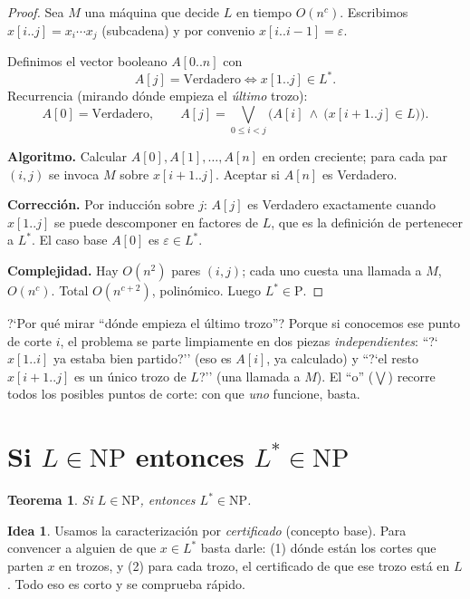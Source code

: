 \documentclass[11pt,a4paper]{article}
\theoremstyle{plain}
\newtheorem{teorema}{Teorema}
\theoremstyle{definition}
\newtheorem*{idea}{Idea}
\newcommand{\NP}{\mathrm{NP}}
\newcommand{\Pclass}{\mathrm{P}}
\newcommand{\Lstar}{L^{*}}
\begin{document}
\begin{proof}
Sea $M$ una m\'aquina que decide $L$ en tiempo $O(n^{c})$. Escribimos
$x[i..j]=x_i\cdots x_j$ (subcadena) y por convenio $x[i..i-1]=\varepsilon$.

Definimos el vector booleano $A[0..n]$ con
\[
A[j] = \text{Verdadero} \iff x[1..j]\in\Lstar .
\]
Recurrencia (mirando d\'onde empieza el \emph{\'ultimo} trozo):
\[
A[0]=\text{Verdadero}, \qquad
A[j]=\bigvee_{0\le i<j}\Big(A[i]\ \wedge\ \big(x[i+1..j]\in L\big)\Big).
\]

\textbf{Algoritmo.} Calcular $A[0],A[1],\dots,A[n]$ en orden creciente; para cada par
$(i,j)$ se invoca $M$ sobre $x[i+1..j]$. Aceptar si $A[n]$ es Verdadero.

\textbf{Correcci\'on.} Por inducci\'on sobre $j$: $A[j]$ es Verdadero exactamente
cuando $x[1..j]$ se puede descomponer en factores de $L$, que es la definici\'on de
pertenecer a $\Lstar$. El caso base $A[0]$ es $\varepsilon\in\Lstar$.

\textbf{Complejidad.} Hay $O(n^2)$ pares $(i,j)$; cada uno cuesta una llamada a $M$,
$O(n^c)$. Total $O(n^{c+2})$, polin\'omico. Luego $\Lstar\in\Pclass$.
\end{proof}

\begin{porque}
?`Por qu\'e mirar ``d\'onde empieza el \'ultimo trozo''? Porque si conocemos ese punto
de corte $i$, el problema se parte limpiamente en dos piezas \emph{independientes}:
``?`$x[1..i]$ ya estaba bien partido?'' (eso es $A[i]$, ya calculado) y ``?`el resto
$x[i+1..j]$ es un \'unico trozo de $L$?'' (una llamada a $M$). El ``o'' ($\bigvee$)
recorre todos los posibles puntos de corte: con que \emph{uno} funcione, basta.
\end{porque}

\section{Si $L\in\NP$ entonces $\Lstar\in\NP$}

\begin{teorema}
Si $L\in\NP$, entonces $\Lstar\in\NP$.
\end{teorema}

\begin{idea}
Usamos la caracterizaci\'on por \emph{certificado} (concepto base). Para convencer a
alguien de que $x\in\Lstar$ basta darle: (1) d\'onde est\'an los cortes que parten
$x$ en trozos, y (2) para cada trozo, el certificado de que ese trozo est\'a en $L$.
Todo eso es corto y se comprueba r\'apido.
\end{idea}
\end{document}
